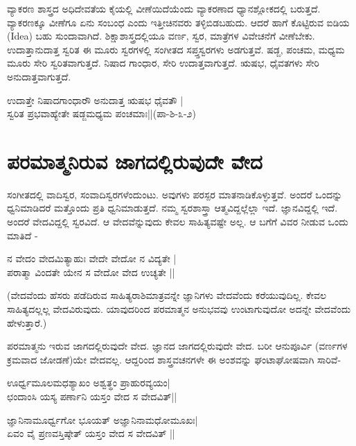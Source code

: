 ವ್ಯಾಕರಣ ಶಾಸ್ತ್ರದ ಅಧಿದೇವತೆಯ ಕೈಯಲ್ಲಿ ವೀಣೆಯಿದೆಯೆಂದು ವ್ಯಾಕರಣಾದ ಧ್ಯಾನಶ್ಲೋಕದಲ್ಲಿ ಬರುತ್ತದೆ. ವ್ಯಾಕರಣಕ್ಕೂ ವೀಣೆಗೂ ಏನು ಸಂಬಂಧ ಎಂದು ಇತ್ತೀಚಿನವರು ತಳ್ಳಿಬಿಡಬಹುದು. ಆದರೆ ಹಾಗೆ ಕೊಟ್ಟಿರುವ ಐಡಿಯ (Idea) ಬಹು ಸುಂದಾವಾಗಿದೆ. ಶಿಕ್ಷಾಶಾಸ್ತ್ರದಲ್ಲಿಯೂ ವರ್ಣ, ಸ್ವರ, ಮಾತ್ರೆಗಳ ವಿವೇಚನೆಗೆ ವೀಣೆಬೇಕು. ಉದಾತ್ತಾನುದಾತ್ತ ಸ್ವರಿತ ಈ ಮೂರು ಸ್ವರಗಳಲ್ಲಿ ಸಂಗೀತದ ಸಪ್ತ್ತಸ್ವರಗಳು ಅಡಗುತ್ತವೆ.  ಷಡ್ಜ, ಪಂಚಮ, ಮಧ್ಯಮ ಮೂರು ಸೇರಿ ಸ್ವರಿತವಾಗುತ್ತದೆ. ನಿಷಾದ ಗಾಂಧಾರ, ಸೇರಿ ಉದಾತ್ತವಾಗುತ್ತದೆ. ಋಷಭ, ಧೈವತಗಳು ಸೇರಿ ಅನುದಾತ್ತವಾಗುತ್ತದೆ.

\begin{shloka}
ಉದಾತ್ತೇ ನಿಷಾದಗಾಂಧಾರೌ ಅನುದಾತ್ತ ಋಷಭ ಧೈವತೌ |\\
ಸ್ವರಿತ ಪ್ರಭವಾಹ್ಯೇತೇ ಷಡ್ಜಮಧ್ಯಮ ಪಂಚಮಾಃ||(ಪಾ-ಶಿ-೩-೨)
\end{shloka}

\section*{ಪರಮಾತ್ಮನಿರುವ ಜಾಗದಲ್ಲಿರುವುದೇ ವೇದ}

ಸಂಗೀತದಲ್ಲಿ ವಾದಿಸ್ವರ, ಸಂವಾದಿಸ್ವರಗಳೆಂದುಂಟು. ಅವುಗಳು ಪರಸ್ಪರ ಮಾತನಾಡಿಕೊಳ್ಳುತ್ತವೆ. ಅಂದರೆ ಒಂದನ್ನು ಧ್ವನಿಮಾಡಿದರೆ ಮತ್ತೊಂದು ಪ್ರತಿ ಧ್ವನಿಮಾಡುತ್ತದೆ. ನಮ್ಮ ಸ್ವರಶಾಸ್ತ್ರಾ ಆತ್ಮವಿದ್ದಲ್ಲೆಲ್ಲಾ ಇದೆ. ಜ್ಞಾನವಿದ್ದಲ್ಲಿ ಇದೆ. ಅಂದರೆ ವೇದವಿದ್ದಲ್ಲಿ ಸ್ವರವಿದೆ. ಆ ವೇದವೆನ್ನುವುದು ಕೇವಲ ಸಾಹಿತ್ಯವಷ್ಟೇ ಅಲ್ಲ. ಆ ಬಗೆಗೆ ವಿವರ ನೀಡುವ ಒಂದು ಮಾತಿದೆ -

\begin{shloka}
ನ ವೇದಂ ವೇದಮಿತ್ಯಾಹುಃ ವೇದೇ ವೇದೋ ನ ವಿದ್ಯತೇ |\\
ಪರಾತ್ಮಾ ವಿಂದತೇ ಯೇನ ಸ ವೇದೋ ವೇದ ಉಚ್ಯತೇ ||
\end{shloka}

(ವೇದವೆಂದು ಹೆಸರು ಪಡೆದಿರುವ ಸಾಹಿತ್ಯರಾಶಿಮಾತ್ರವನ್ನೇ ಜ್ಞಾನಿಗಳು ವೇದವೆಂದು ಕರೆಯುವುದಿಲ್ಲ. ಕೇವಲ ಸಾಹಿತ್ಯದಲ್ಲಲ್ಲ  ವೇದವಿರುವುದು. ಯಾವುದರಿಂದ ಪರಮಾತ್ಮನ ಅನುಭವವು  ಉಂಟಾಗುವುದೋ ಅದನ್ನೇ ವೇದವೆಂದು ಹೇಳುತ್ತಾರೆ.)

ಪರಮಾತ್ಮನು ಇರುವ ಜಾಗದಲ್ಲಿರುವುದೇ ವೇದ. ಜ್ಞಾನದ ಜಾಗದಲ್ಲಿರುವುದೇ ವೇದ. ಬರೀ ಆನುಪೂರ್ವಿ (ವರ್ಣಗಳ ಕ್ರಮವಾದ ಜೋಡಣೆ)ಯೇ ವೇದವಲ್ಲ. ಆದ್ದರಿಂದ ಶಾಸ್ತ್ರವಚನಗಳೇ ಈ ಅಂಶವನ್ನು  ಘಂಟಾಘೋಷವಾಗಿ ಸಾರಿವೆ-

\begin{shloka}
ಊರ್ಧ್ವಮೂಲಮಧಶ್ಯಾಖಂ ಅಶ್ವತ್ಥಂ ಪ್ರಾಹುರವ್ಯಯಂ|\\
ಛಂದಾಂಸಿ ಯಸ್ಯ ಪರ್ಣಾನಿ ಯಸ್ತಂ ವೇದ ಸ ವೇದವಿತ್||
\end{shloka}

\begin{shloka}
ಜ್ಞಾನಿನಾಮೂರ್ಧ್ವಗೋ ಭೂಯತ್ ಅಜ್ಞಾನಿನಾಮಧೋಮೂಖಃ|\\
ಏವಂ ವೈ ಪ್ರಣವಸ್ತಿಷ್ಠೇತ್ ಯಸ್ತಂ ವೇದ ಸ ವೇದವಿತ್ ||
\end{shloka}

